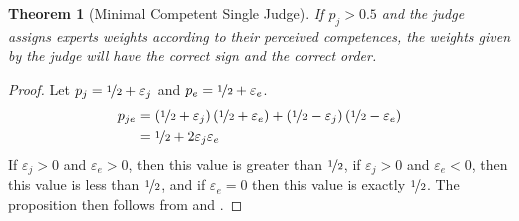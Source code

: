 \documentclass[letterpaper]{article} %
\newtheorem{theorem}{Theorem}
\newcommand{\judge}{\ensuremath{j} }
\newcommand{\expert}{\ensuremath{e} }
\begin{document}
\begin{theorem}[Minimal Competent Single Judge]\label{thm:minimal_comp}
 If $p_j > 0.5$ and the judge assigns experts weights according to their perceived competences, the weights given by the judge will have the correct sign and the correct order.
\end{theorem}

 \begin{proof}
 Let $p_\judge = \nicefrac{1}{2} + \varepsilon_\judge$ and $p_\expert = \nicefrac{1}{2} + \varepsilon_\expert$.
\small
 \begin{align*}
 p_{\judge \expert} & = \left(\nicefrac{1}{2} + \varepsilon_\judge \right) \left(\nicefrac{1}{2} + \varepsilon_\expert \right) + \left(\nicefrac{1}{2} - \varepsilon_\judge \right) \left(\nicefrac{1}{2} - \varepsilon_\expert \right)\\
 & = \nicefrac{1}{2} + 2 \varepsilon_\judge \varepsilon_\expert \label{Eq:11}
 \end{align*}
\normalsize
 If $\varepsilon_\judge > 0$ and $\varepsilon_\expert > 0$, then this value is greater than $\nicefrac{1}{2}$, if $\varepsilon_\judge > 0$ and $\varepsilon_\expert < 0$, then this value is less than $\nicefrac{1}{2}$, and if $\varepsilon_\expert = 0$ then this value is exactly $\nicefrac{1}{2}$. The proposition then follows from  and .
 \end{proof}
\end{document}
